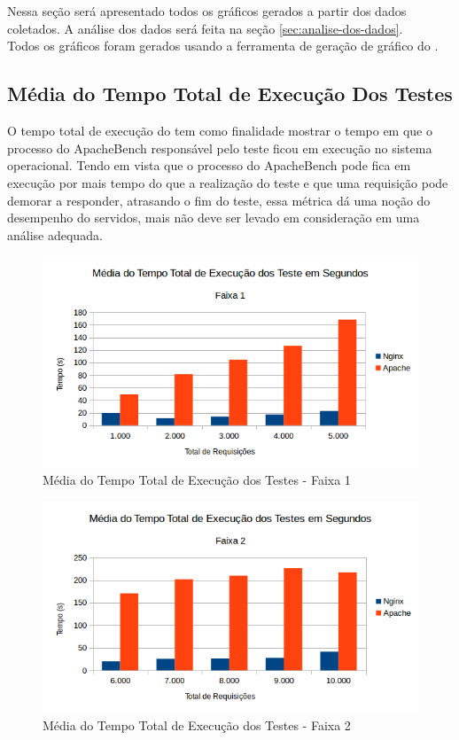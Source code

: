\section{}
Nessa seção será apresentado todos os gráficos gerados a partir dos dados 
coletados. A análise dos dados será feita na seção 
\ref{sec:analise-dos-dados}.\\
Todos os gráficos foram gerados usando a ferramenta de geração de gráfico do 
.
\subsection{Média do Tempo Total de Execução Dos Testes}
O tempo total de execução do tem como finalidade mostrar o tempo em que o 
processo do ApacheBench responsável pelo teste ficou em execução no sistema 
operacional. Tendo em vista que o processo do ApacheBench pode fica em execução 
por mais tempo do que a realização do teste e que uma requisição pode demorar a 
responder, atrasando o fim do teste, essa métrica dá uma noção do desempenho do 
servidos, mais não deve ser levado em consideração em uma análise adequada.\\
\begin{figure}[H]
	\centering
	\includegraphics[width=1\linewidth]{graficos/grafico1-f1} 
	\caption{Média do Tempo Total de Execução dos Testes - Faixa 1}
	\label{fig:grafico1-f1}
\end{figure}

\begin{figure}[H]
	\centering
	\includegraphics[width=1\linewidth]{graficos/grafico1-f2} 
	\caption{Média do Tempo Total de Execução dos Testes - Faixa 2}
	\label{fig:grafico1-f2}
\end{figure}

